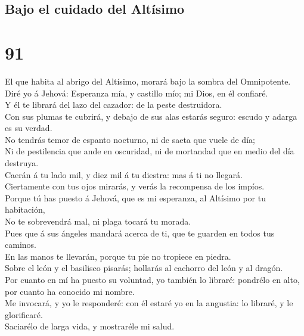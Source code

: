 \hypertarget{bajo-el-cuidado-del-altuxedsimo}{%
\subsection{Bajo el cuidado del
Altísimo}\label{bajo-el-cuidado-del-altuxedsimo}}

\hypertarget{section-19-91}{%
\section{91}\label{section-19-91}}

 El que habita al abrigo del Altísimo, morará bajo la
sombra del Omnipotente.\\
 Diré yo á Jehová: Esperanza mía, y castillo mío; mi Dios,
en él confiaré.\\
 Y él te librará del lazo del cazador: de la peste
destruidora.\\
 Con sus plumas te cubrirá, y debajo de sus alas estarás
seguro: escudo y adarga es su verdad.\\
 No tendrás temor de espanto nocturno, ni de saeta que
vuele de día;\\
 Ni de pestilencia que ande en oscuridad, ni de mortandad
que en medio del día destruya.\\
 Caerán á tu lado mil, y diez mil á tu diestra: mas á ti
no llegará.\\
 Ciertamente con tus ojos mirarás, y verás la recompensa
de los impíos.\\
 Porque tú has puesto á Jehová, que es mi esperanza, al
Altísimo por tu habitación,\\
 No te sobrevendrá mal, ni plaga tocará tu morada.\\
 Pues que á sus ángeles mandará acerca de ti, que te
guarden en todos tus caminos.\\
 En las manos te llevarán, porque tu pie no tropiece en
piedra.\\
 Sobre el león y el basilisco pisarás; hollarás al
cachorro del león y al dragón.\\
 Por cuanto en mí ha puesto su voluntad, yo también lo
libraré: pondrélo en alto, por cuanto ha conocido mi nombre.\\
 Me invocará, y yo le responderé: con él estaré yo en la
angustia: lo libraré, y le glorificaré.\\
 Saciarélo de larga vida, y mostraréle mi salud.

